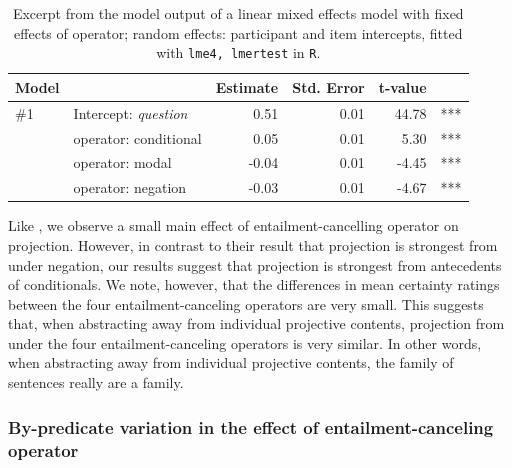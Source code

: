 \documentclass[a4paper,12pt,twoside]{article}
\begin{document}
			\begin{table}[ht]
					\centering
					\hspace{-1.3em}
					\begin{tabular}{llrrrr}
						Model & & Estimate & Std. Error & t-value\\
						\midrule
						\#1 & Intercept: \emph{question} & 0.51 & 0.01 & 44.78 & ***\\
						& operator: conditional & 0.05 & 0.01 & 5.30 & ***\\
						& operator: modal & -0.04 & 0.01 & -4.45 & ***\\
						& operator: negation & -0.03 & 0.01 & -4.67 & ***\\
						\bottomrule
					\end{tabular}
				
					\caption{Excerpt from the model output of a linear mixed effects model with fixed effects of operator; random effects: participant and item intercepts, fitted with \texttt{lme4, lmertest} in \texttt{R}.\label{t:op-model}}
				\end{table}

			Like \citet{sieker_projective_2022}, we observe a small main effect of entailment-cancelling operator on projection. However, in contrast to their result that projection is strongest from under negation, our results suggest that projection is strongest from antecedents of conditionals.
            We note, however, that the differences in mean certainty ratings between the four entailment-canceling operators are very small. This suggests that, when abstracting away from individual projective contents, projection from under the four entailment-canceling operators is very similar. In other words, when abstracting away from individual projective contents, the family of sentences really are a family.


		\subsubsection{By-predicate variation in the effect of entailment-canceling operator}\label{s:by-pred}
\end{document}
